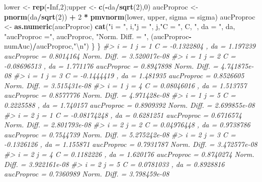 \documentclass[
]{book}
\newenvironment{Shaded}{\begin{snugshade}}{\end{snugshade}}
\newcommand{\CharTok}[1]{\textcolor[rgb]{0.31,0.60,0.02}{#1}}
\newcommand{\CommentTok}[1]{\textcolor[rgb]{0.56,0.35,0.01}{\textit{#1}}}
\newcommand{\DataTypeTok}[1]{\textcolor[rgb]{0.13,0.29,0.53}{#1}}
\newcommand{\DecValTok}[1]{\textcolor[rgb]{0.00,0.00,0.81}{#1}}
\newcommand{\KeywordTok}[1]{\textcolor[rgb]{0.13,0.29,0.53}{\textbf{#1}}}
\newcommand{\NormalTok}[1]{#1}
\newcommand{\OperatorTok}[1]{\textcolor[rgb]{0.81,0.36,0.00}{\textbf{#1}}}
\newcommand{\OtherTok}[1]{\textcolor[rgb]{0.56,0.35,0.01}{#1}}
\newcommand{\StringTok}[1]{\textcolor[rgb]{0.31,0.60,0.02}{#1}}
\begin{document}
\begin{Shaded}
\begin{Highlighting}[]
\NormalTok{    lower \textless{}{-}}\StringTok{ }\KeywordTok{rep}\NormalTok{(}\OperatorTok{{-}}\OtherTok{Inf}\NormalTok{,}\DecValTok{2}\NormalTok{);upper \textless{}{-}}\StringTok{ }\KeywordTok{c}\NormalTok{(}\OperatorTok{{-}}\NormalTok{da}\OperatorTok{/}\KeywordTok{sqrt}\NormalTok{(}\DecValTok{2}\NormalTok{),}\DecValTok{0}\NormalTok{)}
\NormalTok{    aucProproc \textless{}{-}}\StringTok{ }\KeywordTok{pnorm}\NormalTok{(da}\OperatorTok{/}\KeywordTok{sqrt}\NormalTok{(}\DecValTok{2}\NormalTok{)) }\OperatorTok{+}\StringTok{ }\DecValTok{2} \OperatorTok{*}\StringTok{ }\KeywordTok{pmvnorm}\NormalTok{(lower, upper, }\DataTypeTok{sigma =}\NormalTok{ sigma)}
\NormalTok{    aucProproc \textless{}{-}}\StringTok{  }\KeywordTok{as.numeric}\NormalTok{(aucProproc)}
    \KeywordTok{cat}\NormalTok{(}\StringTok{"i = "}\NormalTok{, i,}\StringTok{"j = "}\NormalTok{, j,}\StringTok{"C = "}\NormalTok{, C, }\StringTok{", da = "}\NormalTok{, da, }\StringTok{"aucProproc ="}\NormalTok{, aucProproc, }\StringTok{"Norm. Diff. = "}\NormalTok{, (aucProproc}\OperatorTok{{-}}\NormalTok{numAuc)}\OperatorTok{/}\NormalTok{aucProproc,}\StringTok{"}\CharTok{\textbackslash{}n}\StringTok{"}\NormalTok{)}
\NormalTok{  \}}
\NormalTok{\}}
\CommentTok{\#\textgreater{} i =  1 j =  1 C =  {-}0.1322804 , da =  1.197239 aucProproc = 0.8014164 Norm. Diff. =  3.520017e{-}08 }
\CommentTok{\#\textgreater{} i =  1 j =  2 C =  {-}0.08696513 , da =  1.771176 aucProproc = 0.8947898 Norm. Diff. =  4.741875e{-}08 }
\CommentTok{\#\textgreater{} i =  1 j =  3 C =  {-}0.1444419 , da =  1.481935 aucProproc = 0.8526605 Norm. Diff. =  3.515431e{-}08 }
\CommentTok{\#\textgreater{} i =  1 j =  4 C =  0.08046016 , da =  1.513757 aucProproc = 0.8577776 Norm. Diff. =  4.971428e{-}08 }
\CommentTok{\#\textgreater{} i =  1 j =  5 C =  0.2225588 , da =  1.740157 aucProproc = 0.8909392 Norm. Diff. =  2.699855e{-}08 }
\CommentTok{\#\textgreater{} i =  2 j =  1 C =  {-}0.08174248 , da =  0.6281251 aucProproc = 0.6716574 Norm. Diff. =  2.801793e{-}08 }
\CommentTok{\#\textgreater{} i =  2 j =  2 C =  0.04976448 , da =  0.9738786 aucProproc = 0.7544739 Norm. Diff. =  5.275242e{-}08 }
\CommentTok{\#\textgreater{} i =  2 j =  3 C =  {-}0.1326126 , da =  1.155871 aucProproc = 0.7931787 Norm. Diff. =  3.472577e{-}08 }
\CommentTok{\#\textgreater{} i =  2 j =  4 C =  0.1182226 , da =  1.620176 aucProproc = 0.8740274 Norm. Diff. =  3.922161e{-}08 }
\CommentTok{\#\textgreater{} i =  2 j =  5 C =  0.0781033 , da =  0.8928816 aucProproc = 0.7360989 Norm. Diff. =  3.798459e{-}08}
\end{Highlighting}
\end{Shaded}
\end{document}
